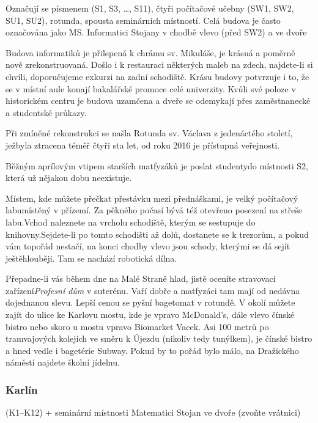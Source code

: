 {Označují se písmenem  (S1, S3, \dots, S11), čtyři počítačové učebny (SW1,
SW2, SU1, SU2), rotunda, spousta seminárních místností. Celá budova je často
označována jako MS.}
{Informatici}
{Stojany v chodbě vlevo (před SW2) a ve dvoře}

\noindent Budova informatiků je přilepená k chrámu sv. Mikuláše, je krásná
a poměrně nově zrekonstruovaná. Došlo i k restauraci některých maleb na
zdech, najdete-li si chvíli, doporučujeme exkurzi na zadní schodiště. Krásu
budovy potvrzuje i to, že se v místní aule konají bakalářské promoce celé
univerzity. Kvůli své poloze v historickém centru je budova
uzamčena a dveře se odemykají přes zaměstnanecké a studentské průkazy.

Při zmíněné rekonstrukci se našla Rotunda sv. Václava z jedenáctého století,
ježbyla ztracena téměř čtyři sta let, od roku 2016 je přístupná veřejnosti.

Běžným aprílovým vtipem starších matfyzáků je poslat
studentydo místnosti S2, která už nějakou dobu neexistuje.

Místem, kde můžete přečkat přestávku mezi přednáškami, je velký počítačový
labumístěný v přízemí. Za pěkného počasí bývá též otevřeno posezení na střeše
labu.Vchod naleznete na vrcholu schodiště, kterým se sestupuje do
knihovny.Sejdete-li po tomto schodišti až dolů, dostanete se k trezorům, a pokud
vám topořád nestačí, na konci chodby vlevo jsou schody, kterými se dá sejít
ještěhlouběji. Tam se nachází robotická dílna.

Přepadne-li vás během dne na Malé Straně hlad, jistě oceníte stravovací
zařízení\textit{Profesní dům} v suterénu. Vaří dobře a matfyzáci tam mají od
nedávna dojednanou slevu. Lepší cenou se pyšní bagetomat v rotundě. V
okolí můžete zajít do ulice ke Karlovu mostu, kde je vpravo McDonald's, dále
vlevo čínské bistro nebo skoro u mostu vpravo Biomarket Vacek. Asi 100 metrů po
tramvajových kolejích ve směru k Újezdu (nikoliv tedy tunýlkem), je čínské bistro
a hned vedle i bagetérie Subway. Pokud by to pořád bylo málo, na Dražického
náměstí najdete školní jídelnu.


\subsubsection{Karlín}

{ (K1--K12) + seminární místnosti}
{Matematici}
{Stojan ve dvoře (zvoňte vrátnici)}


